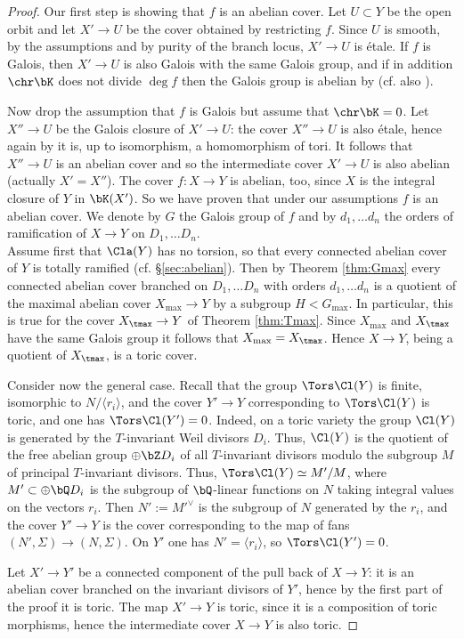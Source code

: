 \documentclass[10pt]{amsart}
\numberwithin{equation}{section}
\begin{document}
\begin{proof}
Our first step is showing that $f$ is an abelian cover. Let $U\subset Y$ be the open orbit and let $X'\to U$ be   the cover obtained by restricting $f$. Since $U$ is smooth, by  the assumptions and by purity of the branch locus, $X'\to U$ is \'etale. If $f$ is Galois, then  $X'\to U$  is also Galois with the same Galois group,  and if  in addition  $\chr\bK$ does  not divide  $\deg f$ then the Galois group is abelian by   \cite[Thm.~1]{Miyanishi}  (cf. also \cite{brion-szamuely}). 

Now drop the assumption that $f$ is Galois but assume  that $\chr\bK=0$.  
Let $X''\to U$ be the Galois closure of $X'\to U$:  the cover $X''\to U$ is also \'etale, hence again 
by \cite[Thm.~1]{Miyanishi}  it is, up to isomorphism, a homomorphism of tori.
It follows that  $X''\to U$ is an abelian cover and so  the intermediate cover $X'\to U$ is also abelian (actually $X'=X''$). The cover $f\colon X\to Y$ is   abelian, too,  since  $X$ is the integral closure of $Y$ in $\bK(X')$. 
So we have proven that under our assumptions $f$ is an abelian cover. We denote by $G$ the Galois group of $f$ and by   $d_1,\dots d_n$  the orders of ramification of $X\to Y$ on $D_1,\dots D_n$.\\
Assume first that  $\Cla(Y)$ has no torsion, so that  every connected  abelian cover of $Y$ is totally ramified (cf. \S \ref{sec:abelian}). 
Then  by  Theorem \ref{thm:Gmax} every connected  abelian cover  branched on $D_1,\dots D_n$ with orders $d_1,\dots d_n$ is a quotient of the maximal abelian cover $X_{\max}\to Y$ by a subgroup $H<G_{\max}$. In particular, this is true for the cover $X_{\tmax}\to Y$ of Theorem \ref{thm:Tmax}. Since $X_{\max}$ and $X_{\tmax}$ have the same Galois group it follows that $X_{\max}=X_{\tmax}$. Hence $X\to Y$, being a quotient of $X_{\tmax}$, is a toric cover. 

Consider now the general case. Recall that the group $\Tors\Cl(Y)$ is finite, 
isomorphic to $N/ \langle r_i \rangle$, and  the cover $Y'\to Y$
corresponding to $\Tors\Cl(Y)$ is toric, and one has
$\Tors\Cl(Y')=0$.
Indeed, on a toric variety the group $\Cl(Y)$ is generated by the $T$-invariant
Weil divisors $D_i$. Thus, $\Cl(Y)$ is the quotient of the free
abelian group $\oplus \bZ D_i$ of all $T$-invariant divisors modulo
the subgroup $M$ of principal $T$-invariant divisors. Thus,
$\Tors\Cl(Y)\simeq M'/M$, where $M'\subset \oplus\bQ D_i$ is the
subgroup of $\bQ$-linear functions on $N$ taking integral values on
the vectors $r_i$. Then $N':=M'^\vee$
is the subgroup of $N$ generated by the $r_i$, and the cover $Y'\to Y$ is
the cover corresponding to the map of fans $(N',\Sigma)\to
(N,\Sigma)$. On $Y'$ one has $N'=\langle r_i\rangle$, so $\Tors\Cl(Y')=0$. 

Let $X'\to Y'$ be a connected component of
the pull back of $X\to Y$: it is an abelian cover branched on the invariant divisors of $Y'$, hence by the first part of the proof it is toric. The  map $X'\to Y$  is toric, since it is a composition of toric morphisms, hence the intermediate cover $X\to Y$ is also toric. 
\end{proof}
\end{document}
